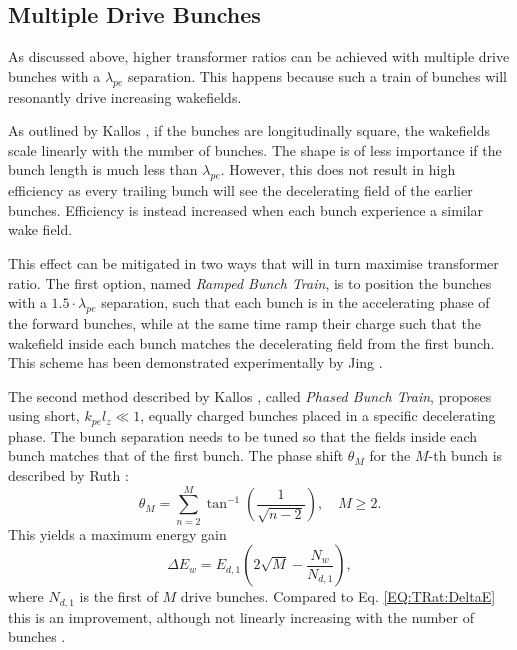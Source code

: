 \subsection{Multiple Drive Bunches}
\label{Int:BPI:Multi}

As discussed above, higher transformer ratios can be achieved with multiple drive bunches with a $\lambda_{pe}$ separation. This happens because such a train of bunches will resonantly drive increasing wakefields.

As outlined by Kallos \etal \cite{kallos:2007}, if the bunches are longitudinally square, the wakefields scale linearly with the number of bunches. The shape is of less importance if the bunch length is much less than $\lambda_{pe}$. However, this does not result in high efficiency as every trailing bunch will see the decelerating field of the earlier bunches. Efficiency is instead increased when each bunch experience a similar wake field.

This effect can be mitigated in two ways that will in turn maximise transformer ratio. The first option, named \textit{Ramped Bunch Train}, is to position the bunches with a $1.5\cdot\lambda_{pe}$ separation, such that each bunch is in the accelerating phase of the forward bunches, while at the same time ramp their charge such that the wakefield inside each bunch matches the decelerating field from the first bunch. This scheme has been demonstrated experimentally by Jing \etal \cite{jing:2006,jing:2007}.

The second method described by Kallos \etal, called \textit{Phased Bunch Train}, proposes using short, $k_{pe}l_{z} \ll 1$, equally charged bunches placed in a specific decelerating phase. The bunch separation needs to be tuned so that the fields inside each bunch matches that of the first bunch. The phase shift $\theta_{M}$ for the $M$-th bunch is described by Ruth \etal \cite{ruth:1985}:
\begin{equation}
    \theta_{M} = \sum^{M}_{n=2}\tan^{-1}\left(\frac{1}{\sqrt{n-2}}\right),\quad M \geq 2. \label{EQ:TrainPhase}
\end{equation}
This yields a maximum energy gain
\begin{equation}
    \Delta E_{w} = E_{d,1}\left(2\sqrt{M}-\frac{N_{w}}{N_{d,1}}\right), \label{EQ:TrainPhaseMaxE}
\end{equation}
where $N_{d,1}$ is the first of $M$ drive bunches. Compared to Eq. \ref{EQ:TRat:DeltaE} this is an improvement, although not linearly increasing with the number of bunches \cite{ruth:1985}.

